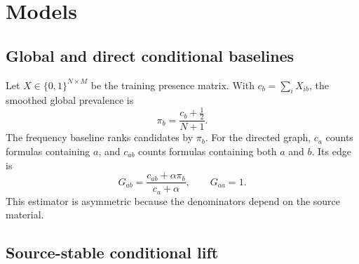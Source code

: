 \documentclass[11pt,a4paper]{article}
\begin{document}
\section{Models}

\subsection{Global and direct conditional baselines}

Let $X\in\{0,1\}^{N\times M}$ be the training presence matrix. With $c_b=\sum_i X_{ib}$, the smoothed global prevalence is
\begin{equation}
\pi_b=\frac{c_b+\tfrac12}{N+1}.
\label{eq:globalprev}
\end{equation}
The frequency baseline ranks candidates by $\pi_b$. For the directed graph, $c_a$ counts formulas containing $a$, and $c_{ab}$ counts formulas containing both $a$ and $b$. Its edge is
\begin{equation}
G_{ab}=\frac{c_{ab}+\alpha\pi_b}{c_a+\alpha},\qquad G_{aa}=1.
\label{eq:directgraph}
\end{equation}
This estimator is asymmetric because the denominators depend on the source material.

\subsection{Source-stable conditional lift}
\end{document}
